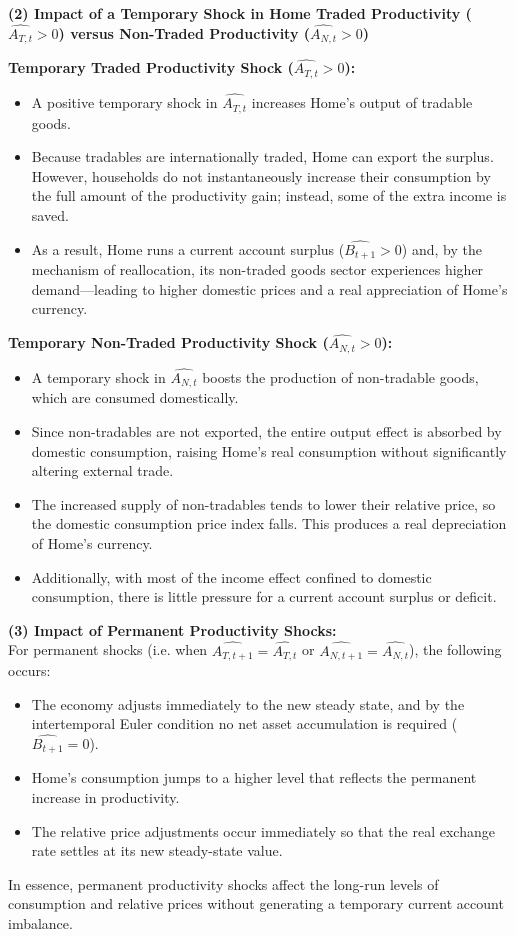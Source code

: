 \documentclass[a4paper,12pt]{article} %
\theoremstyle{nonitalic}
\begin{document}
\textbf{(2) Impact of a Temporary Shock in Home Traded Productivity (\( \widehat{A_{T,t}} > 0 \)) versus Non-Traded Productivity (\( \widehat{A_{N,t}} > 0 \))}

\textbf{Temporary Traded Productivity Shock (\( \widehat{A_{T,t}} > 0 \)):}
\begin{itemize}
    \item A positive temporary shock in \( \widehat{A_{T,t}} \) increases Home's output of tradable goods.
    \item Because tradables are internationally traded, Home can export the surplus. However, households do not instantaneously increase their consumption by the full amount of the productivity gain; instead, some of the extra income is saved.
    \item As a result, Home runs a current account surplus (\( \widehat{B_{t+1}} > 0 \)) and, by the mechanism of reallocation, its non-traded goods sector experiences higher demand—leading to higher domestic prices and a real appreciation of Home's currency.
\end{itemize}

\textbf{Temporary Non-Traded Productivity Shock (\( \widehat{A_{N,t}} > 0 \)):}
\begin{itemize}
    \item A temporary shock in \( \widehat{A_{N,t}} \) boosts the production of non-tradable goods, which are consumed domestically.
    \item Since non-tradables are not exported, the entire output effect is absorbed by domestic consumption, raising Home's real consumption without significantly altering external trade.
    \item The increased supply of non-tradables tends to lower their relative price, so the domestic consumption price index falls. This produces a real depreciation of Home's currency.
    \item Additionally, with most of the income effect confined to domestic consumption, there is little pressure for a current account surplus or deficit.
\end{itemize}

\textbf{(3) Impact of Permanent Productivity Shocks:}\\[1mm]
For permanent shocks (i.e. when \( \widehat{A_{T,t+1}} = \widehat{A_{T,t}} \) or \( \widehat{A_{N,t+1}} = \widehat{A_{N,t}} \)), the following occurs:
\begin{itemize}
    \item The economy adjusts immediately to the new steady state, and by the intertemporal Euler condition no net asset accumulation is required (\( \widehat{B_{t+1}} = 0 \)).
    \item Home's consumption jumps to a higher level that reflects the permanent increase in productivity.
    \item The relative price adjustments occur immediately so that the real exchange rate settles at its new steady-state value.
\end{itemize}
In essence, permanent productivity shocks affect the long-run levels of consumption and relative prices without generating a temporary current account imbalance.
\end{document}
